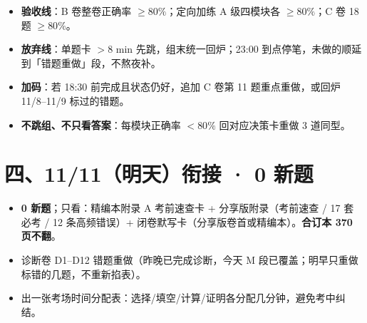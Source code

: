 \documentclass[11pt,a4paper]{ctexart}
\begin{document}
\begin{itemize}\itemsep2pt
\item \textbf{验收线}：B 卷整卷正确率 $\ge 80\%$；定向加练 A 级四模块各 $\ge 80\%$；C 卷 18 题 $\ge 80\%$。
\item \textbf{放弃线}：单题卡 $>8$ min 先跳，组末统一回炉；23:00 到点停笔，未做的顺延到「错题重做」段，不熬夜补。
\item \textbf{加码}：若 18:30 前完成且状态仍好，追加 C 卷第 11 题重点重做，或回炉 11/8–11/9 标过的错题。
\item \textbf{不跳组、不只看答案}：每模块正确率 $<80\%$ 回对应决策卡重做 3 道同型。
\end{itemize}

\section{四、11/11（明天）衔接 · 0 新题}

\begin{keypoint}[考前保温]
\begin{itemize}\itemsep2pt
\item \textbf{0 新题}；只看：精编本附录 A 考前速查卡 + 分享版附录（考前速查 / 17 套必考 / 12 条高频错误）+ 闭卷默写卡（分享版卷首或精编本）。\textbf{合订本 370 页不翻}。
\item 诊断卷 D1–D12 错题重做（昨晚已完成诊断，今天 M 段已覆盖；明早只重做标错的几题，不重新掐表）。
\item 出一张考场时间分配表：选择/填空/计算/证明各分配几分钟，避免考中纠结。
\end{itemize}
\end{keypoint}

\vfill
{}
\end{document}
